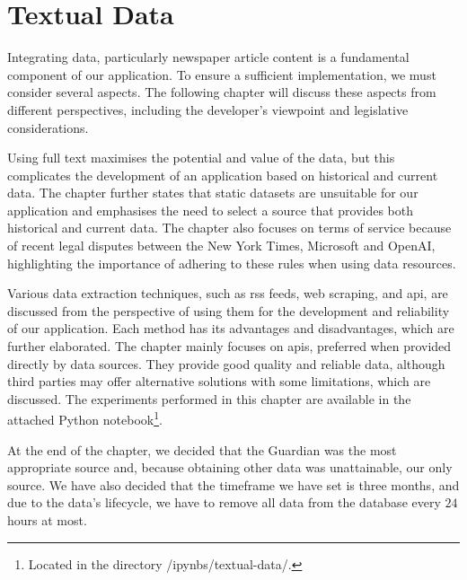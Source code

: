 \chapter{Textual Data}
\label{chap:textual-data}
Integrating data, particularly newspaper article content is a fundamental component of our application. To ensure a sufficient implementation, we must consider several aspects. The following chapter will discuss these aspects from different perspectives, including the developer's viewpoint and legislative considerations.

Using full text maximises the potential and value of the data, but this complicates the development of an application based on historical and current data. The chapter further states that static datasets are unsuitable for our application and emphasises the need to select a source that provides both historical and current data. The chapter also focuses on terms of service because of recent legal disputes between the New York Times, Microsoft and OpenAI, highlighting the importance of adhering to these rules when using data resources.

Various data extraction techniques, such as \acrshort{rss} feeds, web scraping, and \acrshort{api}, are discussed from the perspective of using them for the development and reliability of our application. Each method has its advantages and disadvantages, which are further elaborated. The chapter mainly focuses on \acrshort{api}s, preferred when provided directly by data sources. They provide good quality and reliable data, although third parties may offer alternative solutions with some limitations, which are discussed. The experiments performed in this chapter are available in the attached Python notebook\footnote{Located in the directory /ipynbs/textual-data/.}.

At the end of the chapter, we decided that the Guardian was the most appropriate source and, because obtaining other data was unattainable, our only source. We have also decided that the timeframe we have set is three months, and due to the data's lifecycle, we have to remove all data from the database every $24$ hours at most.

